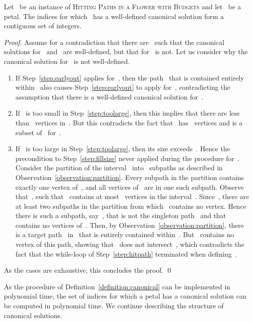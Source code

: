 \let\accentvec\vec  \documentclass{llncs}
\newcommand{\HitPathsInFlower}{\textsc{Hitting Paths in a Flower with Budgets}\xspace}
\begin{document}
\begin{lemma} \label{lemma:contiguous}
Let~ be an instance of \HitPathsInFlower and let~ be a petal. The indices for which~ has a well-defined canonical solution form a contiguous set of integers.
\end{lemma}
\begin{proof}
Assume for a contradiction that there are~ such that the canonical solutions for~ and~ are well-defined, but that for~ is not. Let us consider why the canonical solution for~ is not well-defined. 
\begin{enumerate}
	\item If Step~\ref{step:earlyout} applies for~, then the path~ that is contained entirely within~ also causes Step~\ref{step:earlyout} to apply for~, contradicting the assumption that there is a well-defined canonical solution for~.
	\item If~ is too small in Step~\ref{step:toolarge}, then this implies that there are less than~ vertices in~. But this contradicts the fact that~ has~ vertices and is a subset of~ for~.
	\item If~ is too large in Step~\ref{step:toolarge}, then its size exceeds~. Hence the precondition to Step~\ref{step:fillsize} never applied during the procedure for~. Consider the partition of the interval~ into~ subpaths as described in Observation~\ref{observation:partition}. Every subpath in the partition contains exactly one vertex of~, and all vertices of~ are in one such subpath. Observe that~, such that~ contains at most~ vertices in the interval~. Since~, there are at least two subpaths in the partition from which~ contains no vertex. Hence there is such a subpath, say~, that is not the singleton path~ and that contains no vertices of~. Then, by Observation~\ref{observation:partition}, there is a target path~ in~ that is entirely contained within~. But~ contains no vertex of this path, showing that~ does not intersect~, which contradicts the fact that the while-loop of Step~\ref{step:hitpath} terminated when defining~.
\end{enumerate}
As the cases are exhaustive, this concludes the proof.
\qed
\end{proof}

As the procedure of Definition~\ref{definition:canonical} can be implemented in polynomial time, the set of indices for which a petal has a canonical solution can be computed in polynomial time. We continue describing the structure of canonical solutions.
\end{document}
